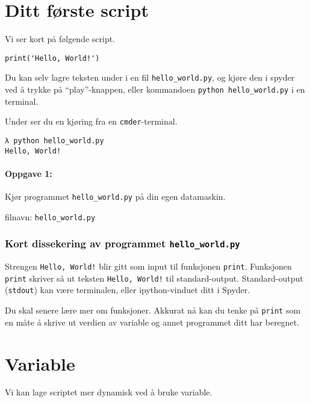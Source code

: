 \documentclass[]{article}
\date{}
\let\oldparagraph\paragraph
\renewcommand{\paragraph}[1]{\oldparagraph{#1}\mbox{}}
\begin{document}
\section{Ditt første script}\label{ditt-fuxf8rste-script}

Vi ser kort på følgende script.

\begin{verbatim}
print('Hello, World!')
\end{verbatim}

Du kan selv lagre teksten under i en fil \texttt{hello\_world.py}, og
kjøre den i spyder ved å trykke på ``play''-knappen, eller kommandoen
\texttt{python\ hello\_world.py} i en terminal.

Under ser du en kjøring fra en \texttt{cmder}-terminal.

\begin{verbatim}
λ python hello_world.py
Hello, World!
\end{verbatim}

\paragraph{Oppgave 1:}\label{oppgave-1}

Kjør programmet \texttt{hello\_world.py} på din egen datamaskin.

filnavn: \texttt{hello\_world.py}

\subsubsection{\texorpdfstring{Kort dissekering av programmet
\texttt{hello\_world.py}}{Kort dissekering av programmet hello\_world.py}}\label{kort-dissekering-av-programmet-hello_world.py}

Strengen \texttt{Hello,\ World!} blir gitt som input til funksjonen
\texttt{print}. Funksjonen \texttt{print} skriver så ut teksten
\texttt{Hello,\ World!} til standard-output. Standard-output
(\texttt{stdout}) kan være terminalen, eller ipython-vinduet ditt i
Spyder.

Du skal senere lære mer om funksjoner. Akkurat nå kan du tenke på
\texttt{print} som en måte å skrive ut verdien av variable og annet
programmet ditt har beregnet.

\section{Variable}\label{variable}

Vi kan lage scriptet mer dynamisk ved å bruke variable.
\end{document}
